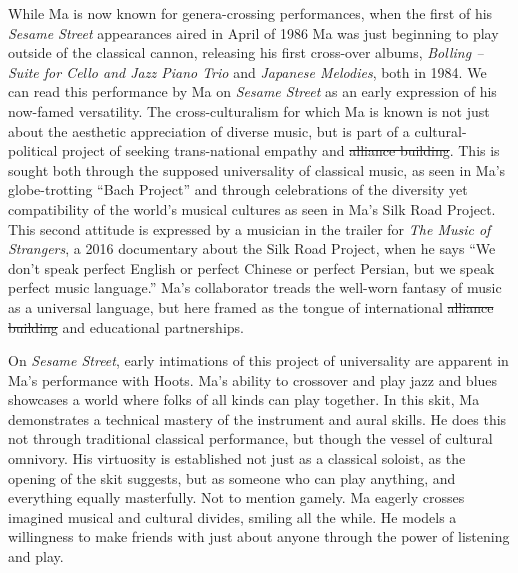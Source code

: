 \documentclass[12pt,letterpaper]{article}
\providecommand{\DIFadd}[1]{{\protect\color{blue}\uwave{#1}}} %
\providecommand{\DIFdel}[1]{{\protect\color{red}\sout{#1}}}                      %
\providecommand{\DIFaddbegin}{} %
\providecommand{\DIFaddend}{} %
\providecommand{\DIFdelbegin}{} %
\providecommand{\DIFdelend}{} %
\newcommand{\DIFscaledelfig}{0.5}
\newlength{\DIFdelgraphicswidth} %
\newlength{\DIFdelgraphicsheight} %
\newcommand{\DIFaddincludegraphics}[2][]{{\color{blue}\fbox{\DIFOincludegraphics[#1]{#2}}}} %
\newcommand{\DIFdelincludegraphics}[2][]{%
\sbox{\DIFdelgraphicsbox}{\DIFOincludegraphics[#1]{#2}}%
\settoboxwidth{\DIFdelgraphicswidth}{\DIFdelgraphicsbox} %
\settoboxtotalheight{\DIFdelgraphicsheight}{\DIFdelgraphicsbox} %
\scalebox{\DIFscaledelfig}{%
\parbox[b]{\DIFdelgraphicswidth}{\usebox{\DIFdelgraphicsbox}\\[-\baselineskip] \rule{\DIFdelgraphicswidth}{0em}}\llap{\resizebox{\DIFdelgraphicswidth}{\DIFdelgraphicsheight}{%
\setlength{\unitlength}{\DIFdelgraphicswidth}%
\begin{picture}(1,1)%
\thicklines\linethickness{2pt} %
{\color[rgb]{1,0,0}\put(0,0){\framebox(1,1){}}}%
{\color[rgb]{1,0,0}\put(0,0){\line( 1,1){1}}}%
{\color[rgb]{1,0,0}\put(0,1){\line(1,-1){1}}}%
\end{picture}%
}\hspace*{3pt}}} %
} %
\DeclareRobustCommand{\DIFaddbegin}{\DIFOaddbegin \let\includegraphics\DIFaddincludegraphics} %
\DeclareRobustCommand{\DIFaddend}{\DIFOaddend \let\includegraphics\DIFOincludegraphics} %
\DeclareRobustCommand{\DIFdelbegin}{\DIFOdelbegin \let\includegraphics\DIFdelincludegraphics} %
\DeclareRobustCommand{\DIFdelend}{\DIFOaddend \let\includegraphics\DIFOincludegraphics} %
\begin{document}
	While Ma is now known for genera-crossing performances, when the first
	of his \textit{Sesame Street} appearances aired in April of
	1986\autocite{2210} Ma was just beginning to play outside of the 
	classical cannon, releasing his first cross-over albums, 
	\textit{Bolling – Suite for Cello and Jazz Piano Trio} and 
	\textit{Japanese Melodies}, both in 1984.\autocite{MaSite} We can read 
	this performance by Ma on \textit{Sesame Street} as an early expression
	of his now-famed versatility. The cross-culturalism for which Ma is 
	known is not just about the aesthetic appreciation of diverse music, but
	is part of a cultural-political project of seeking trans-national 
	empathy and \DIFdelbegin \DIFdel{alliance building}\DIFdelend \DIFaddbegin \DIFadd{fellowship}\DIFaddend . This is sought both through the supposed 
	universality of classical music, as seen in Ma's globe-trotting 
	``Bach Project''\autocite{BachProject} and through celebrations of the 
	diversity yet compatibility of the world's musical cultures as seen in 
	Ma's Silk Road Project. This second attitude is expressed by a musician 
	in the trailer for \textit{The Music of Strangers}, a 2016 documentary 
	about the Silk Road Project, when he says ``We don't speak perfect 
	English or perfect Chinese or perfect Persian, but we speak perfect 
	music language.''\autocite{Strangers} Ma's collaborator treads the
	well-worn fantasy of music as a universal language, but here framed as
	the tongue of international \DIFdelbegin \DIFdel{alliance building }\DIFdelend \DIFaddbegin \DIFadd{fellowship }\DIFaddend and educational
	partnerships.

	On \textit{Sesame Street}, early intimations of this project of 
	universality are apparent in Ma's performance with Hoots. Ma's ability 
	to crossover and play jazz and blues showcases a world where folks of 
	all kinds can play together. In this skit, Ma demonstrates a technical 
	mastery of the instrument and
	aural skills. He does this not through traditional classical 
	performance,
	but though the vessel of cultural omnivory. His virtuosity is 
	established not just as a classical soloist, as the opening of the skit
	suggests, but as someone who can play anything, and everything equally 
	masterfully. Not to mention gamely. Ma eagerly crosses imagined musical
	and cultural divides, smiling all the while. He models a willingness to
	make friends with just about anyone through the power of listening and 
	play.
\end{document}
